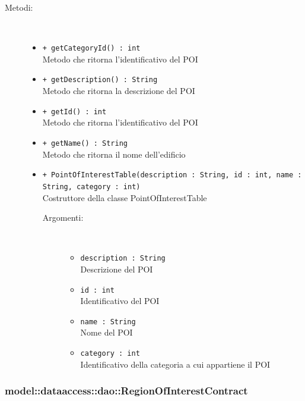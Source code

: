 \documentclass[../DefinizioneDiProdotto.tex]{subfiles}
\begin{document}
\begin{description}
\begin{itemize}
\end{itemize}
\item[Metodi:] \
\begin{itemize}
\item \texttt{+ getCategoryId() : int}\\
Metodo che ritorna l'identificativo del POI
 \item \texttt{+ getDescription() : String}\\
Metodo che ritorna la descrizione del POI
 \item \texttt{+ getId() : int}\\
Metodo che ritorna l'identificativo del POI
 \item \texttt{+ getName() : String}\\
Metodo che ritorna il nome dell'edificio
 \item \texttt{+ PointOfInterestTable(description : String, id : int, name : String, category : int)}\\
Costruttore della classe PointOfInterestTable
 \begin{description}
\item[Argomenti:] \
\begin{itemize}
\item \texttt{description : String}\\
Descrizione del POI\item \texttt{id : int}\\
Identificativo del POI\item \texttt{name : String}\\
Nome del POI\item \texttt{category : int}\\
Identificativo della categoria a cui appartiene il POI\end{itemize}
\end{description}
\end{itemize}
\end{description}

\subsubsection{model::dataaccess::dao::RegionOfInterestContract}
\end{document}
